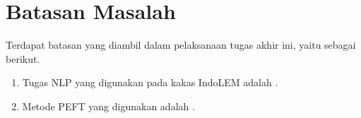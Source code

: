 \section{Batasan Masalah}
\label{sec:batasan-masalah}

Terdapat batasan yang diambil dalam pelaksanaan tugas akhir ini, yaitu sebagai berikut.

\begin{enumerate}
    \item Tugas NLP yang digunakan pada kakas IndoLEM adalah \nlptask.
    \item Metode PEFT yang digunakan adalah \methodPEFT.
\end{enumerate}
